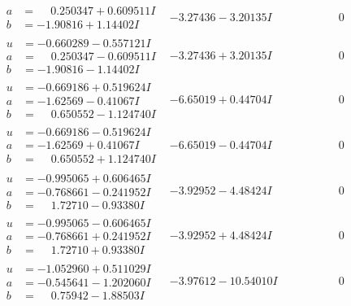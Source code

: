 \documentclass[1p]{elsarticle_modified}
\theoremstyle{definition}
\begin{document}
$$\begin{array}{c|c|c}
\begin{aligned}
a &= \phantom{-}0.250347 + 0.609511 I \\
b &= -1.90816 + 1.14402 I\end{aligned}
 & -3.27436 - 3.20135 I & \phantom{-0.000000 } 0 \\ \hline\begin{aligned}
u &= -0.660289 - 0.557121 I \\
a &= \phantom{-}0.250347 - 0.609511 I \\
b &= -1.90816 - 1.14402 I\end{aligned}
 & -3.27436 + 3.20135 I & \phantom{-0.000000 } 0 \\ \hline\begin{aligned}
u &= -0.669186 + 0.519624 I \\
a &= -1.62569 - 0.41067 I \\
b &= \phantom{-}0.650552 - 1.124740 I\end{aligned}
 & -6.65019 + 0.44704 I & \phantom{-0.000000 } 0 \\ \hline\begin{aligned}
u &= -0.669186 - 0.519624 I \\
a &= -1.62569 + 0.41067 I \\
b &= \phantom{-}0.650552 + 1.124740 I\end{aligned}
 & -6.65019 - 0.44704 I & \phantom{-0.000000 } 0 \\ \hline\begin{aligned}
u &= -0.995065 + 0.606465 I \\
a &= -0.768661 - 0.241952 I \\
b &= \phantom{-}1.72710 - 0.93380 I\end{aligned}
 & -3.92952 - 4.48424 I & \phantom{-0.000000 } 0 \\ \hline\begin{aligned}
u &= -0.995065 - 0.606465 I \\
a &= -0.768661 + 0.241952 I \\
b &= \phantom{-}1.72710 + 0.93380 I\end{aligned}
 & -3.92952 + 4.48424 I & \phantom{-0.000000 } 0 \\ \hline\begin{aligned}
u &= -1.052960 + 0.511029 I \\
a &= -0.545641 - 1.202060 I \\
b &= \phantom{-}0.75942 - 1.88503 I\end{aligned}
 & -3.97612 - 10.54010 I & \phantom{-0.000000 } 0 \\ \hline\begin{aligned}

\end{aligned}
\end{array}$$
\end{document}
